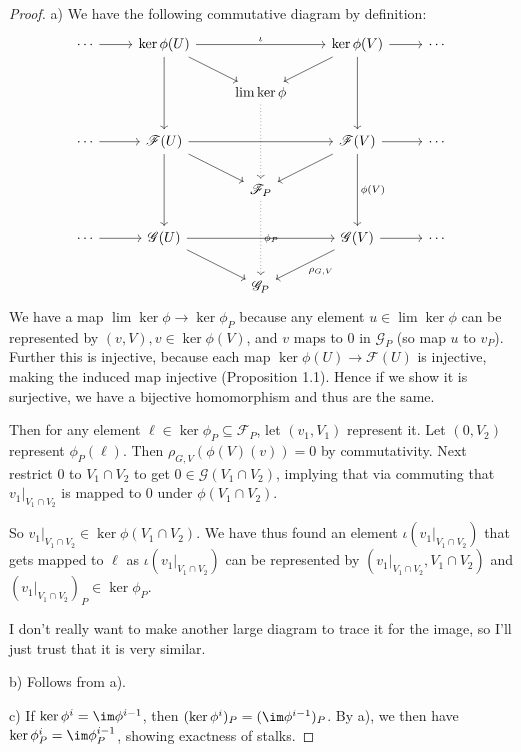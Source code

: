 \begin{proof}
	a)
	We have the following commutative diagram by definition:
	\[
		\begin{tikzcd}
			\cdots & \ker \phi(U) & & \ker \phi(V) & \cdots\\
			       & &\lim \ker \phi & &\\
			\cdots & \mathscr{F}(U) & & \mathscr{F}(V) & \cdots\\
			       & &\mathscr{F}_P & &\\
			\cdots & \mathscr{G}(U) & & \mathscr{G}(V) & \cdots\\
			       & &\mathscr{G}_P & &
			\arrow[from=1-1,to=1-2]
			\arrow["\iota ",from=1-2,to=1-4]
			\arrow[from=1-4,to=1-5]
			\arrow[from=3-1,to=3-2]
			\arrow[from=3-2,to=3-4]
			\arrow[from=3-4,to=3-5]
			\arrow[from=5-1,to=5-2]
			\arrow[from=5-2,to=5-4]
			\arrow[from=5-4,to=5-5]
			\arrow[from=1-2,to=2-3]
			\arrow[from=1-2,to=3-2]
			\arrow[from=3-2,to=5-2]
			\arrow[from=1-4,to=3-4]
			\arrow["\phi (V)",from=3-4,to=5-4]
			\arrow[from=1-4,to=2-3]
			\arrow[from=3-2,to=4-3]
			\arrow[from=3-4,to=4-3]
			\arrow[from=5-2,to=6-3]
			\arrow["\rho_{G,V}",from=5-4,to=6-3]
			\arrow[dotted,from=2-3,to=4-3]
			\arrow["\phi_P",dotted,from=4-3,to=6-3]
		\end{tikzcd}
	\] 
	We have a map $\lim\ker \phi \to \ker \phi_P $ because any element $u \in \lim \ker \phi $ can be represented by $(v,V), v\in \ker \phi(V)$, and $v $ maps to 0 in $\mathscr{G}_P $ (so map $u $ to $v_P $).
	Further this is injective, because each map $\ker \phi(U) \to \mathscr{F}(U) $ is injective, making the induced map injective (Proposition 1.1).
	Hence if we show it is surjective, we have a bijective homomorphism and thus are the same.

	Then for any element $\ell \in \ker \phi_P \subseteq \mathscr{F}_P $, let $(v_{1},V_{1}) $ represent it.
	Let $(0,V_{2}) $ represent $\phi _P(\ell) $.
	Then $\rho_{G,V}(\phi(V)(v)) = 0 $ by commutativity.
	Next restrict $0 $ to $V_{1}\cap V_{2} $ to get $0\in \mathscr{G}(V_{1}\cap V_{2}) $, implying that via commuting that $v_{1}|_{V_{1}\cap V_{2}} $ is mapped to 0 under $\phi(V_{1}\cap V_{2})$.

	So $v_{1}|_{V_{1}\cap V_{2}}\in \ker \phi(V_{1}\cap V_{2}) $.
	We have thus found an element $\iota(v_{1}|_{V_{1}\cap V_{2}}) $ that gets mapped to $\ell $ as $\iota(v_{1}|_{V_{1}\cap V_{2}}) $ can be represented by $(v_{1}|_{V_{1}\cap V_{2}},V_{1}\cap V_{2}) $ and $(v_{1}|_{V_{1}\cap V_{2}})_P \in \ker \phi_P$.

	I don't really want to make another large diagram to trace it for the image, so I'll just trust that it is very similar.

	b)
	Follows from a).

	c) If $\ker \phi^{i} = \im \phi^{i-1}$, then $(\ker \phi^i)_P = (\im \phi^{i-1})_P $.
	By a), we then have $\ker \phi^{i}_P = \im \phi^{i-1}_P $, showing exactness of stalks.
\end{proof}

